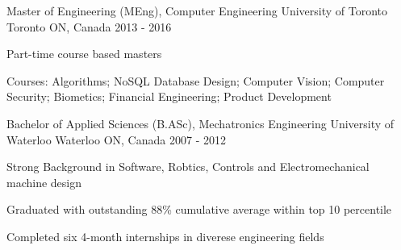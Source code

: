 

\begin{cventries}

  \cventry
    {Master of Engineering (MEng), Computer Engineering} %
    {University of Toronto} %
    {Toronto ON, Canada} %
    {2013 - 2016} %
    {
      \begin{cvitems} %
        \item {Part-time course based masters}
        \item {Courses: Algorithms; NoSQL Database Design; Computer Vision; Computer Security; Biometics; Financial Engineering; Product Development}
      \end{cvitems}
    }

  \cventry
    {Bachelor of Applied Sciences (B.ASc), Mechatronics Engineering} %
    {University of Waterloo} %
    {Waterloo ON, Canada} %
    {2007 - 2012} %
    {
      \begin{cvitems} %
        \item {Strong Background in Software, Robtics, Controls and Electromechanical machine design}
        \item {Graduated with outstanding 88\% cumulative average within top 10 percentile}
        \item {Completed six 4-month internships in diverese engineering fields}
      \end{cvitems}
    }

\end{cventries}
